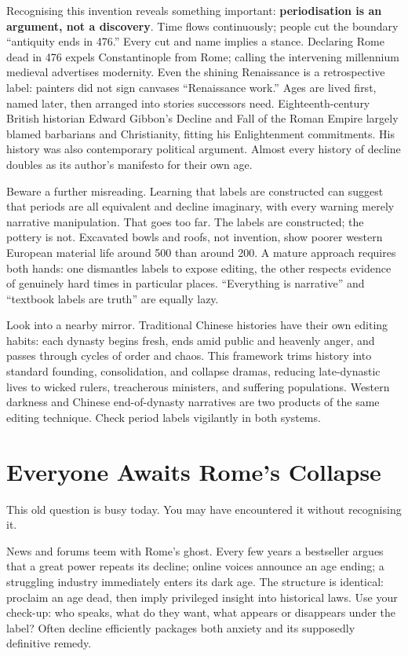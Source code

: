 Recognising this invention reveals something important: \textbf{periodisation is an argument, not a discovery}. Time flows continuously; people cut the boundary ``antiquity ends in 476.'' Every cut and name implies a stance. Declaring Rome dead in 476 expels Constantinople from Rome; calling the intervening millennium medieval advertises modernity. Even the shining Renaissance is a retrospective label: painters did not sign canvases ``Renaissance work.'' Ages are lived first, named later, then arranged into stories successors need. Eighteenth-century British historian Edward Gibbon's Decline and Fall of the Roman Empire largely blamed barbarians and Christianity, fitting his Enlightenment commitments. His history was also contemporary political argument. Almost every history of decline doubles as its author's manifesto for their own age.

Beware a further misreading. Learning that labels are constructed can suggest that periods are all equivalent and decline imaginary, with every warning merely narrative manipulation. That goes too far. The labels are constructed; the pottery is not. Excavated bowls and roofs, not invention, show poorer western European material life around 500 than around 200. A mature approach requires both hands: one dismantles labels to expose editing, the other respects evidence of genuinely hard times in particular places. ``Everything is narrative'' and ``textbook labels are truth'' are equally lazy.

Look into a nearby mirror. Traditional Chinese histories have their own editing habits: each dynasty begins fresh, ends amid public and heavenly anger, and passes through cycles of order and chaos. This framework trims history into standard founding, consolidation, and collapse dramas, reducing late-dynastic lives to wicked rulers, treacherous ministers, and suffering populations. Western darkness and Chinese end-of-dynasty narratives are two products of the same editing technique. Check period labels vigilantly in both systems.

\section{Everyone Awaits Rome's Collapse}
This old question is busy today. You may have encountered it without recognising it.

News and forums teem with Rome's ghost. Every few years a bestseller argues that a great power repeats its decline; online voices announce an age ending; a struggling industry immediately enters its dark age. The structure is identical: proclaim an age dead, then imply privileged insight into historical laws. Use your check-up: who speaks, what do they want, what appears or disappears under the label? Often decline efficiently packages both anxiety and its supposedly definitive remedy.

